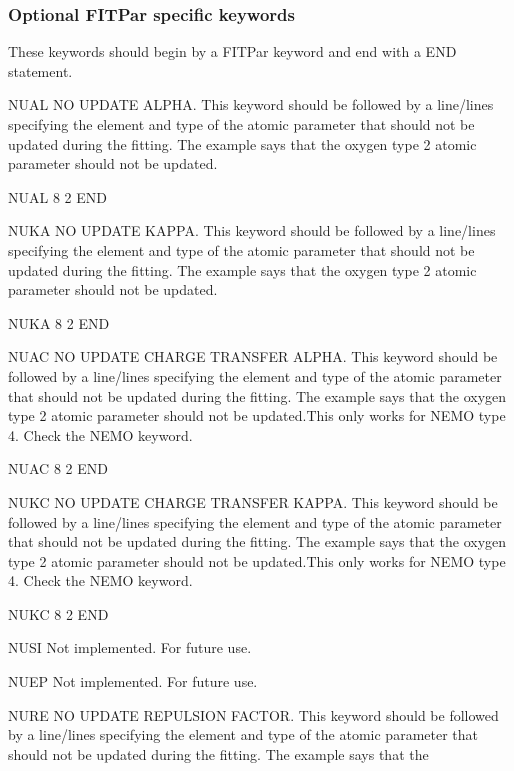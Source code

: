 \subsubsection{Optional FITPar specific keywords}
These keywords should begin by a FITPar keyword and end with a END statement.
\begin{keywordlist}
\item[NUAL]
NO UPDATE ALPHA. This keyword should be followed by a line/lines specifying the element and type
of the atomic parameter that should not be updated during the fitting. The example says that the
oxygen type 2 atomic parameter should not be updated.
\begin{inputlisting}
NUAL
8 2
END
\end{inputlisting}
\item[NUKA]
NO UPDATE KAPPA. This keyword should be followed by a line/lines specifying the element and type
of the atomic parameter that should not be updated during the fitting. The example says that the
oxygen type 2 atomic parameter should not be updated.
\begin{inputlisting}
NUKA
8 2
END
\end{inputlisting}
\item[NUAC]
NO UPDATE CHARGE TRANSFER ALPHA. This keyword should be followed by a line/lines specifying the element and type
of the atomic parameter that should not be updated during the fitting. The example says that the
oxygen type 2 atomic parameter should not be updated.This only works for NEMO type 4. Check the NEMO keyword.
\begin{inputlisting}
NUAC
8 2
END
\end{inputlisting}
\item[NUKC]
NO UPDATE CHARGE TRANSFER KAPPA. This keyword should be followed by a line/lines specifying the element and type
of the atomic parameter that should not be updated during the fitting. The example says that the
oxygen type 2 atomic parameter should not be updated.This only works for NEMO type 4. Check the NEMO keyword.
\begin{inputlisting}
NUKC
8 2
END
\end{inputlisting}
\item[NUSI]
Not implemented. For future use.
\item[NUEP]
Not implemented. For future use.
\item[NURE]
NO UPDATE REPULSION FACTOR. This keyword should be followed by a line/lines specifying the element and type
of the atomic parameter that should not be updated during the fitting. The example says that the

\end{keywordlist}
